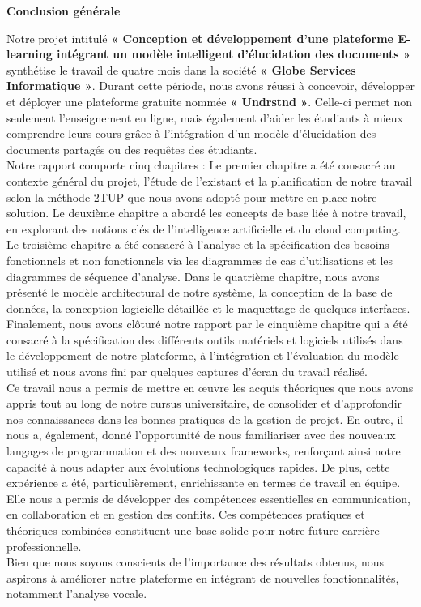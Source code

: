 \thispagestyle{plain} 
\begin{center}
    \textbf{\Huge Conclusion générale}
\end{center}
  
Notre projet intitulé \textbf{« Conception et développement d’une plateforme E-learning intégrant un modèle intelligent d’élucidation des documents »} synthétise le travail de quatre mois dans la société \textbf{« Globe Services Informatique »}. Durant cette période, nous avons réussi à concevoir, développer et déployer  une plateforme  gratuite nommée \textbf{« Undrstnd »}. Celle-ci permet non seulement l’enseignement en ligne, mais également d’aider les étudiants à mieux comprendre leurs cours grâce à l'intégration d’un modèle d’élucidation des documents partagés ou des requêtes des étudiants. \\

Notre rapport comporte cinq chapitres : Le premier chapitre a été consacré au contexte général du projet, l’étude de l’existant et la planification de notre travail selon la méthode 2TUP que nous avons adopté pour mettre en place notre solution. Le deuxième chapitre a abordé les concepts de base liée à notre travail, en explorant des notions clés de l’intelligence artificielle et du cloud computing. Le troisième chapitre a été consacré à l’analyse et la spécification des besoins fonctionnels et non fonctionnels via les diagrammes de cas d’utilisations et les diagrammes de séquence d’analyse. Dans le quatrième chapitre, nous avons présenté le modèle architectural de notre système, la conception de la base de données, la conception logicielle détaillée et le maquettage de quelques interfaces. Finalement, nous avons clôturé notre rapport par le cinquième chapitre qui a été consacré à la spécification des différents outils matériels et logiciels utilisés dans le développement de notre plateforme, à l’intégration et l’évaluation du modèle utilisé et nous avons fini par quelques captures d’écran du travail réalisé.\\

Ce travail nous a permis de mettre en œuvre les acquis théoriques que nous avons appris tout au long de notre cursus universitaire, de consolider et d’approfondir nos connaissances dans les bonnes pratiques de la gestion de projet. En outre, il nous a, également, donné l'opportunité de nous familiariser avec des nouveaux langages de programmation et des nouveaux frameworks, renforçant ainsi notre capacité à nous adapter aux évolutions technologiques rapides. De plus, cette expérience a été, particulièrement, enrichissante en termes de travail en équipe. Elle nous a permis de développer des compétences essentielles en communication, en collaboration et en gestion des conflits. Ces compétences pratiques et théoriques combinées constituent une base solide pour notre future carrière professionnelle.\\

\noindent Bien que nous soyons conscients de l'importance des résultats obtenus, nous aspirons à améliorer notre plateforme en intégrant de nouvelles fonctionnalités, notamment l'analyse vocale. 
